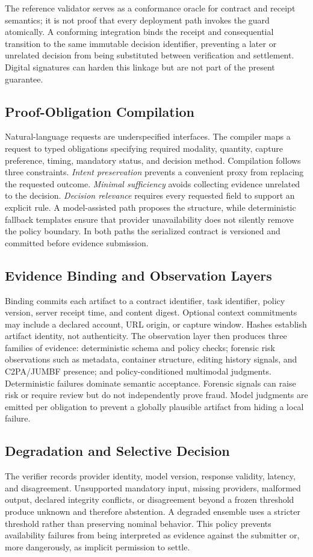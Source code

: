 \documentclass[sigconf,anonymous,review]{acmart}
\begin{document}
The reference validator serves as a conformance oracle for contract and receipt semantics; it is not proof that every deployment path invokes the guard atomically. A conforming integration binds the receipt and consequential transition to the same immutable decision identifier, preventing a later or unrelated decision from being substituted between verification and settlement. Digital signatures can harden this linkage but are not part of the present guarantee.

\subsection{Proof-Obligation Compilation}
Natural-language requests are underspecified interfaces. The compiler maps a request to typed obligations specifying required modality, quantity, capture preference, timing, mandatory status, and decision method. Compilation follows three constraints. \emph{Intent preservation} prevents a convenient proxy from replacing the requested outcome. \emph{Minimal sufficiency} avoids collecting evidence unrelated to the decision. \emph{Decision relevance} requires every requested field to support an explicit rule. A model-assisted path proposes the structure, while deterministic fallback templates ensure that provider unavailability does not silently remove the policy boundary. In both paths the serialized contract is versioned and committed before evidence submission.

\subsection{Evidence Binding and Observation Layers}
Binding commits each artifact to a contract identifier, task identifier, policy version, server receipt time, and content digest. Optional context commitments may include a declared account, URL origin, or capture window. Hashes establish artifact identity, not authenticity. The observation layer then produces three families of evidence: deterministic schema and policy checks; forensic risk observations such as metadata, container structure, editing history signals, and C2PA/JUMBF presence; and policy-conditioned multimodal judgments. Deterministic failures dominate semantic acceptance. Forensic signals can raise risk or require review but do not independently prove fraud. Model judgments are emitted per obligation to prevent a globally plausible artifact from hiding a local failure.

\subsection{Degradation and Selective Decision}
The verifier records provider identity, model version, response validity, latency, and disagreement. Unsupported mandatory input, missing providers, malformed output, declared integrity conflicts, or disagreement beyond a frozen threshold produce unknown and therefore abstention. A degraded ensemble uses a stricter threshold rather than preserving nominal behavior. This policy prevents availability failures from being interpreted as evidence against the submitter or, more dangerously, as implicit permission to settle.
\end{document}
